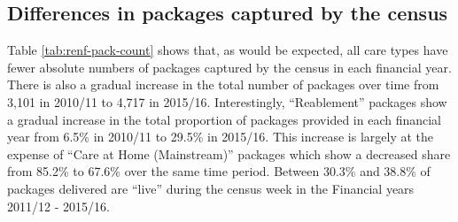 \documentclass[]{article}
\begin{document}
\FloatBarrier

\subsection{Differences in packages captured by the census}\label{subsec:renf-pack-diff}

\begin{table}[]
\centering
\caption{Count of packages by care type}
\label{tab:renf-pack-count}
\end{table}

Table \ref{tab:renf-pack-count} shows that, as would be expected, all
care types have fewer absolute numbers of packages captured by the
census in each financial year. There is also a gradual increase in the
total number of packages over time from 3,101 in 2010/11 to 4,717 in
2015/16. Interestingly, ``Reablement'' packages show a gradual increase
in the total proportion of packages provided in each financial year from
6.5\% in 2010/11 to 29.5\% in 2015/16. This increase is largely at the
expense of ``Care at Home (Mainstream)'' packages which show a decreased
share from 85.2\% to 67.6\% over the same time period. Between 30.3\%
and 38.8\% of packages delivered are ``live'' during the census week in
the Financial years 2011/12 - 2015/16.
\end{document}
